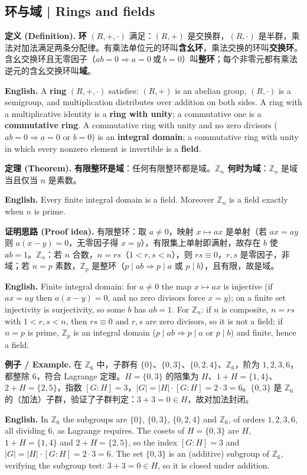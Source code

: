 \documentclass[UTF8,11pt,a4paper]{ctexart}
\newcommand{\EN}[1]{\par\noindent \textbf{English.} #1\par}
\newcommand{\EX}[2]{\par\noindent \textbf{例子 / Example.} #1\par\EN{#2}}
\newcommand{\DEF}[2]{\par\noindent\textbf{定义 (Definition).} #1\par\EN{#2}}
\newcommand{\THM}[2]{\par\noindent\textbf{定理 (Theorem).} #1\par\EN{#2}}
\newcommand{\PRF}[2]{\par\noindent\textbf{证明思路 (Proof idea).} #1\par\EN{#2}}
\begin{document}
\subsection{环与域 | Rings and fields}
\DEF{\textbf{环} $(R,+,\cdot)$ 满足：$(R,+)$ 是交换群，$(R,\cdot)$ 是半群，乘法对加法满足两条分配律。有乘法单位元的环叫\textbf{含幺环}，乘法交换的环叫\textbf{交换环}。含幺交换环且无零因子（$ab=0\Rightarrow a=0\ \text{或}\ b=0$）叫\textbf{整环}；每个非零元都有乘法逆元的含幺交换环叫\textbf{域}。}{A \textbf{ring} $(R,+,\cdot)$ satisfies: $(R,+)$ is an abelian group, $(R,\cdot)$ is a semigroup, and multiplication distributes over addition on both sides. A ring with a multiplicative identity is a \textbf{ring with unity}; a commutative one is a \textbf{commutative ring}. A commutative ring with unity and no zero divisors ($ab=0\Rightarrow a=0$ or $b=0$) is an \textbf{integral domain}; a commutative ring with unity in which every nonzero element is invertible is a \textbf{field}.}
\THM{\textbf{有限整环是域}：任何有限整环都是域。\textbf{$\mathbb Z_n$ 何时为域}：$\mathbb Z_n$ 是域当且仅当 $n$ 是素数。}{Every finite integral domain is a field. Moreover $\mathbb Z_n$ is a field exactly when $n$ is prime.}
\PRF{有限整环：取 $a\ne0$，映射 $x\mapsto ax$ 是单射（若 $ax=ay$ 则 $a(x-y)=0$，无零因子得 $x=y$），有限集上单射即满射，故存在 $b$ 使 $ab=1$。$\mathbb Z_n$：若 $n$ 合数，$n=rs$（$1<r,s<n$），则 $rs\equiv0$，$r,s$ 是零因子，非域；若 $n=p$ 素数，$\mathbb Z_p$ 是整环（$p\mid ab\Rightarrow p\mid a$ 或 $p\mid b$），且有限，故是域。}{Finite integral domain: for $a\ne0$ the map $x\mapsto ax$ is injective (if $ax=ay$ then $a(x-y)=0$, and no zero divisors force $x=y$); on a finite set injectivity is surjectivity, so some $b$ has $ab=1$. For $\mathbb Z_n$: if $n$ is composite, $n=rs$ with $1<r,s<n$, then $rs\equiv0$ and $r,s$ are zero divisors, so it is not a field; if $n=p$ is prime, $\mathbb Z_p$ is an integral domain ($p\mid ab\Rightarrow p\mid a$ or $p\mid b$) and finite, hence a field.}

\EX{在 $\mathbb Z_6$ 中，子群有 $\{0\}$、$\{0,3\}$、$\{0,2,4\}$、$\mathbb Z_6$，阶为 $1,2,3,6$，都整除 $6$，符合 Lagrange 定理。$H=\{0,3\}$ 的陪集为 $H$、$1+H=\{1,4\}$、$2+H=\{2,5\}$，指数 $[G:H]=3$，$|G|=|H|\cdot[G:H]=2\cdot3=6$。$\{0,3\}$ 是 $\mathbb Z_6$ 的（加法）子群，验证了子群判定：$3+3=0\in H$，故对加法封闭。}{In $\mathbb Z_6$ the subgroups are $\{0\}$, $\{0,3\}$, $\{0,2,4\}$ and $\mathbb Z_6$, of orders $1,2,3,6$, all dividing $6$, as Lagrange requires. The cosets of $H=\{0,3\}$ are $H$, $1+H=\{1,4\}$ and $2+H=\{2,5\}$, so the index $[G:H]=3$ and $|G|=|H|\cdot[G:H]=2\cdot3=6$. The set $\{0,3\}$ is an (additive) subgroup of $\mathbb Z_6$, verifying the subgroup test: $3+3=0\in H$, so it is closed under addition.}
\end{document}
